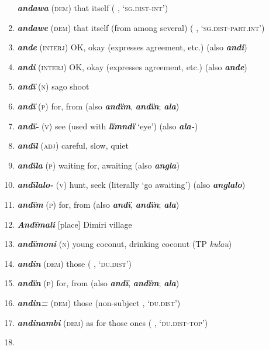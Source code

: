 \begin{enumerate}[noitemsep, label={}, align=left, widest=190, labelsep=1ex,leftmargin=*,itemindent=-10pt]
\textbf{\textit{andawa}} (\textsc{dem}) that itself (   , ‘\textsc{sg.dist-int}’) \item 
\textbf{\textit{andawe}} (\textsc{dem}) that itself (from among several) (  \linebreak {} , ‘\textsc{sg.dist-part.int}’) \item 
\textbf{\textit{ande}} (\textsc{interj}) OK, okay (expresses agreement, etc.) (also \textbf{\textit{andi}}) \item 
\textbf{\textit{andi}} (\textsc{interj}) OK, okay (expresses agreement, etc.) (also \textbf{\textit{ande}}) \item 
\textbf{\textit{andï}} (\textsc{n}) sago shoot \item 
\textbf{\textit{andï}} (\textsc{p}) for, from (also \textbf{\textit{andïm}}, \textbf{\textit{andïn}}; \textbf{\textit{ala}}) \item 
\textbf{\textit{andï-}} (\textsc{v}) see (used with \textbf{\textit{lïmndï}} ‘eye’) (also \textbf{\textit{ala-}}) \item 
\textbf{\textit{andïl}} (\textsc{adj}) careful, slow, quiet \item 
\textbf{\textit{andïla}} (\textsc{p}) waiting for, awaiting (also \textbf{\textit{angla}}) \item 
\textbf{\textit{andïlalo-}} (\textsc{v}) hunt, seek (literally ‘go awaiting’) (also \textbf{\textit{anglalo}}) \item 
\textbf{\textit{andïm}} (\textsc{p}) for, from (also \textbf{\textit{andï}}, \textbf{\textit{andïn}}; \textbf{\textit{ala}}) \item 
\textbf{\textit{Andïmali}} [place] Dimiri village \item 
\textbf{\textit{andïmoni}} (\textsc{n}) young coconut, drinking coconut (TP \textit{kulau}) \item 
\textbf{\textit{andin}} (\textsc{dem}) those (  , ‘\textsc{du.dist}’) \item 
\textbf{\textit{andïn}} (\textsc{p}) for, from (also \textbf{\textit{andï}}, \textbf{\textit{andïm}}; \textbf{\textit{ala}}) \item 
\textbf{\textit{andin=}} (\textsc{dem}) those (non-subject   , ‘\textsc{du.dist}’) \item 
\textbf{\textit{andinambi}} (\textsc{dem}) as for those ones (   , ‘\textsc{du.dist-top}’) \item 

\end{enumerate}
